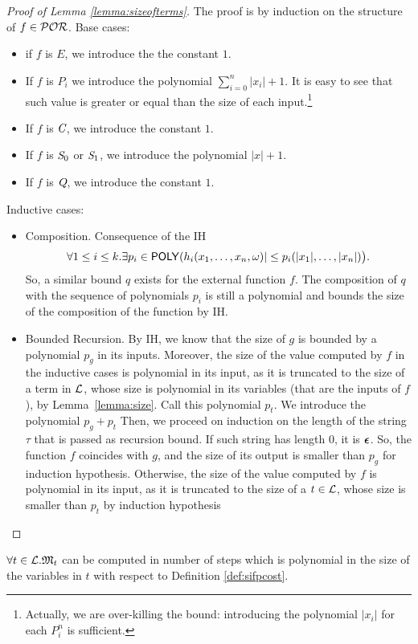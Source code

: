 \portermsize*
\begin{proof}[Proof of Lemma \ref{lemma:sizeofterms}]
The proof is by induction on the structure of $f\in \mathcal{POR}$. Base cases:
\begin{itemize}
\item if $f$ is $E$, we introduce the the constant $1$.
%
\item If $f$ is $P_i$ we introduce the polynomial
$\sum^n_{i=0}|x_i|+1$.
It is easy to see that such value is greater or
equal than the size of each input.\footnote{Actually,
we are over-killing the bound: introducing the polynomial
$|x_i|$ for each
$P^n_i$ is sufficient.}
%
\item If $f$ is $\emph{C}$, we introduce the
constant $1$.
%
\item If $f$ is $\emph{S}_0$ or $\emph{S}_1$, we introduce the
polynomial $|x|+1$.
%
\item If $f$ is $\emph{Q}$, we introduce the constant
$1$.
\end{itemize}
Inductive cases:
\begin{itemize}
\item Composition. Consequence of the IH
$$
\forall 1\leq i\leq k.\exists p_i\in \mathsf{POLY}(h_i(x_1,\dots, x_n,\omega)|
\leq p_i(|x_1|,\dots, |x_n|)\big).
$$
So, a similar bound $q$ exists for the external
function $f$. The composition of $q$
with the sequence of polynomials $p_i$ is
still a polynomial and bounds the size of the composition
of the function by IH.
%
\item Bounded Recursion.
By IH, we know that the size of $g$ is bounded by a polynomial
$p_g$ in its inputs. Moreover, the size of the value computed
by $f$ in the inductive cases is polynomial in its input, as
it is truncated to the size of a term in $\mathcal{L}$,
whose size is polynomial in its variables
(that are the inputs of $f$), by Lemma~\ref{lemma:size}.
Call this polynomial $p_t$. We introduce the polynomial $p_g+p_t$
Then, we proceed on induction
on the length of the string $\tau$ that is passed as recursion bound.
If such string has length $0$, it is
$\bm{\epsilon}$.
So, the function $f$ coincides with $g$,
and the size of its output is smaller than $p_g$ for induction hypothesis.
Otherwise, the size of the value computed
by $f$ is polynomial in its input, as
it is truncated to the size of a $t \in \mathcal{L}$,
whose size is smaller than $p_t$ by induction hypothesis
\end{itemize}
\end{proof}

\begin{lemma}[Complexity of $\MM$]
\label{lemma:compmm}
$\forall t \in \mathcal{L}. \mathfrak M_t$ can be computed in number of steps which is polynomial in the size of the variables in $t$ with respect to Definition \ref{def:sifpcost}.
\end{lemma}

